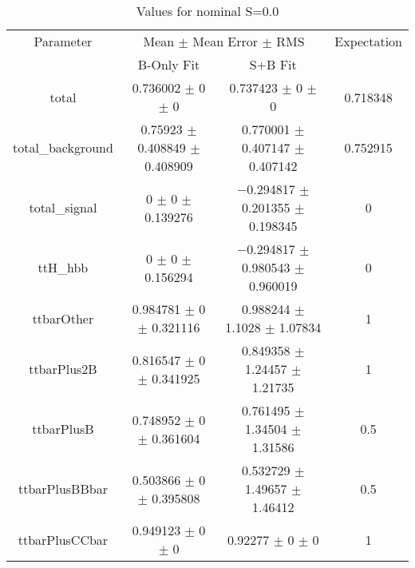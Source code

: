 \begin{table}
\centering
\caption{Values for nominal S=0.0}
\begin{tabular}{cccc}
\toprule
Parameter & \multicolumn{2}{c}{Mean $\pm$ Mean Error $\pm$ RMS} & Expectation\\
 & B-Only Fit & S+B Fit & \\
\midrule
total & \num{0.736002} $\pm$ \num{0} $\pm$ \num{0} & \num{0.737423} $\pm$ \num{0} $\pm$ \num{0} & \num{0.718348}\\
total\_background & \num{0.75923} $\pm$ \num{0.408849} $\pm$ \num{0.408909} & \num{0.770001} $\pm$ \num{0.407147} $\pm$ \num{0.407142} & \num{0.752915}\\
total\_signal & \num{0} $\pm$ \num{0} $\pm$ \num{0.139276} & \num{-0.294817} $\pm$ \num{0.201355} $\pm$ \num{0.198345} & \num{0}\\
ttH\_hbb & \num{0} $\pm$ \num{0} $\pm$ \num{0.156294} & \num{-0.294817} $\pm$ \num{0.980543} $\pm$ \num{0.960019} & \num{0}\\
ttbarOther & \num{0.984781} $\pm$ \num{0} $\pm$ \num{0.321116} & \num{0.988244} $\pm$ \num{1.1028} $\pm$ \num{1.07834} & \num{1}\\
ttbarPlus2B & \num{0.816547} $\pm$ \num{0} $\pm$ \num{0.341925} & \num{0.849358} $\pm$ \num{1.24457} $\pm$ \num{1.21735} & \num{1}\\
ttbarPlusB & \num{0.748952} $\pm$ \num{0} $\pm$ \num{0.361604} & \num{0.761495} $\pm$ \num{1.34504} $\pm$ \num{1.31586} & \num{0.5}\\
ttbarPlusBBbar & \num{0.503866} $\pm$ \num{0} $\pm$ \num{0.395808} & \num{0.532729} $\pm$ \num{1.49657} $\pm$ \num{1.46412} & \num{0.5}\\
ttbarPlusCCbar & \num{0.949123} $\pm$ \num{0} $\pm$ \num{0} & \num{0.92277} $\pm$ \num{0} $\pm$ \num{0} & \num{1}\\
\bottomrule
\end{tabular}
\end{table}